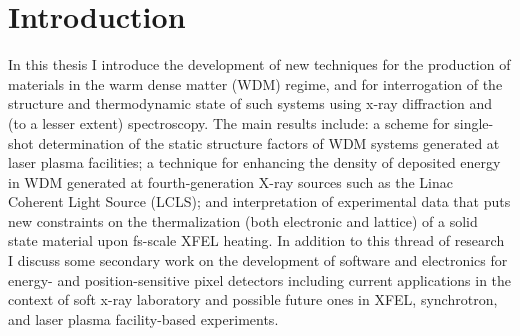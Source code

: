 \documentclass [11pt, proquest, article] {uwthesis}[2016/11/22]
\begin{document}
% 
% 

%
%

%
 
 
 
%
%

\textpages
 
 
\chapter {Introduction}
 
In this thesis I introduce the development of new techniques for the production of materials in the warm dense matter (WDM) regime, and for interrogation of the structure and thermodynamic state of such systems using x-ray diffraction and (to a lesser extent) spectroscopy. The main results include: a scheme for single-shot determination of the static structure factors of WDM systems generated at laser plasma facilities; a technique for enhancing the density of deposited energy in WDM generated at fourth-generation X-ray sources such as the Linac Coherent Light Source (LCLS); and interpretation of experimental data that puts new constraints on the thermalization (both electronic and lattice) of a solid state material upon fs-scale XFEL heating. In addition to this thread of research I discuss some secondary work on the development of software and electronics for energy- and position-sensitive pixel detectors including current applications in the context of soft x-ray laboratory and possible future ones in XFEL, synchrotron, and laser plasma facility-based experiments.
\end{document}
